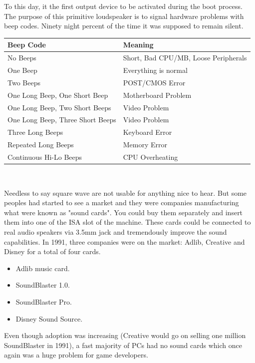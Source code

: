 \documentclass[book.tex]{subfiles}
\begin{document}
\par
 To this day, it the first output device to be activated during the boot process. The purpose of this primitive loudspeaker is to signal hardware problems with beep codes. Ninety night percent of the time it was supposed to remain silent.\\
\par
\begin{tabularx}{\textwidth}{l l}
\textbf{Beep Code} & \textbf{Meaning}  \\ \hline
No Beeps                         & Short, Bad CPU/MB, Loose Peripherals \\ \hline
One Beep                         & Everything is normal\\ \hline
Two Beeps                        & POST/CMOS Error \\ \hline 
One Long Beep, One Short Beep    & Motherboard Problem \\ \hline
One Long Beep, Two Short Beeps   & Video Problem \\ \hline
One Long Beep, Three Short Beeps & Video Problem \\ \hline
Three Long Beeps                 & Keyboard Error \\ \hline
Repeated Long Beeps              & Memory Error \\ \hline
Continuous Hi-Lo Beeps           & CPU Overheating \\ \hline
\end{tabularx}\\
\bigskip
\par
Needless to say square wave are not usable for anything nice to hear. But some peoples had started to see a market and they were companies manufacturing what were known as "sound cards". You could buy them separately and insert them into one of the ISA slot of the machine. These cards could be connected to real audio speakers via 3.5mm jack and tremendously improve the sound capabilities. In 1991, three companies were on the market: Adlib, Creative and Disney for a total of four cards.\\
\par
\begin{itemize}
\item Adlib music card.
\item SoundBlaster 1.0.
\item SoundBlaster Pro.
\item Disney Sound Source.
\end{itemize}
\par
Even though adoption was increasing (Creative would go on selling one million SoundBlaster in 1991), a fast majority of PCs had no sound cards which once again was a huge problem for game developers.
\end{document}
